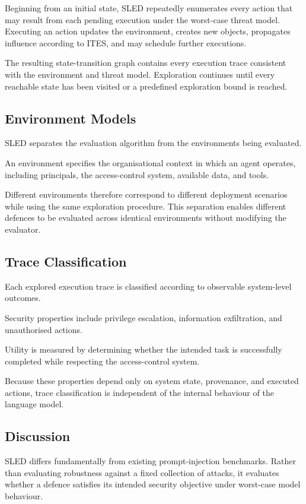 \documentclass{article} %
\begin{document}
Beginning from an initial state, SLED repeatedly enumerates every action that may result from each pending execution under the worst-case threat model. Executing an action updates the environment, creates new objects, propagates influence according to ITES, and may schedule further executions.

The resulting state-transition graph contains every execution trace consistent with the environment and threat model. Exploration continues until every reachable state has been visited or a predefined exploration bound is reached.

\subsection{Environment Models}

SLED separates the evaluation algorithm from the environments being evaluated.

An environment specifies the organisational context in which an agent operates, including principals, the access-control system, available data, and tools.

Different environments therefore correspond to different deployment scenarios while using the same exploration procedure. This separation enables different defences to be evaluated across identical environments without modifying the evaluator.

\subsection{Trace Classification}

Each explored execution trace is classified according to observable system-level outcomes.

Security properties include privilege escalation, information exfiltration, and unauthorised actions.

Utility is measured by determining whether the intended task is successfully completed while respecting the access-control system.

Because these properties depend only on system state, provenance, and executed actions, trace classification is independent of the internal behaviour of the language model.

\subsection{Discussion}

SLED differs fundamentally from existing prompt-injection benchmarks. Rather than evaluating robustness against a fixed collection of attacks, it evaluates whether a defence satisfies its intended security objective under worst-case model behaviour.
\end{document}
